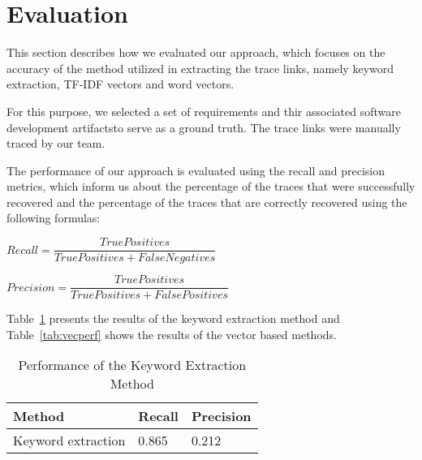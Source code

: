 \section{Evaluation}
\label{sec:eval}


This section describes how we evaluated our approach, which focuses on the accuracy of the method utilized in extracting the trace links, namely keyword extraction, TF-IDF vectors and word vectors.

For this purpose, we selected a set of requirements and thir associated software development artifactsto serve as a ground truth. 
The trace links were manually traced  by our team. 

The performance of our approach is evaluated using the recall and precision metrics, which inform us about the  percentage of the  traces that were successfully recovered and  the percentage of the traces that are correctly recovered using the following formulas:


$Recall = \dfrac{True Positives}{True Positives + False Negatives}$


$Precision = \dfrac{True Positives}{True Positives + False Positives}$


Table~\ref{tab:keyperf} presents the results of the keyword extraction method and 
  Table~\ref{tab:vecperf} shows the results of the vector based methods.


\begin{table}[htb]
\centering
\caption{\label{tab:keyperf}Performance of the Keyword Extraction Method}
\begin{tabular}{lll}
  \toprule
  Method & Recall & Precision\\
  \midrule

Keyword extraction & {0.865} & 0.212 \\
\bottomrule
\end{tabular}
\end{table}

